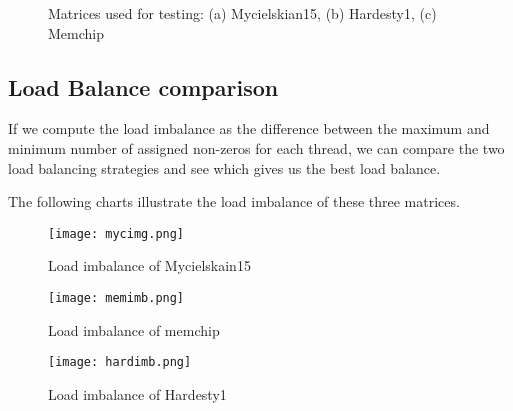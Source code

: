 \documentclass{article}
\begin{document}
\begin{figure}[htp]
    \centering
     \quad
    \quad
    \caption{Matrices used for testing: (a) Mycielskian15, (b) Hardesty1, (c) Memchip}
\end{figure}
    \subsection{Load Balance comparison}
    If we compute the load imbalance as the difference between the maximum and minimum number of assigned non-zeros for each thread, we can compare the two load balancing strategies and see which gives us the best load balance.
    \medskip

    

    The following charts illustrate the load imbalance of these three matrices. 

    \begin{figure}[H]
        \begin{center}
            \texttt{[image: mycimg.png]}
        \end{center}
        \caption{Load imbalance of Mycielskain15}
    \end{figure}

    \begin{figure}[H]
        \begin{center}
            \texttt{[image: memimb.png]}
        \end{center}
        \caption{Load imbalance of memchip}
    \end{figure}

    \begin{figure}[H]
        \begin{center}
            \texttt{[image: hardimb.png]}
        \end{center}
        \caption{Load imbalance of Hardesty1}
    \end{figure}
\end{document}
